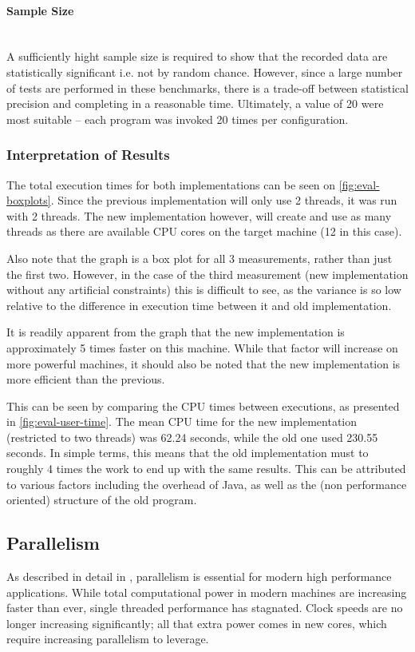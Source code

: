 \paragraph{Sample Size} \hfill \\
A sufficiently hight sample size is required to show that the recorded data are statistically significant i.e. not by random chance. However, since a large number of tests are performed in these benchmarks, there is a trade-off between statistical precision and completing in a reasonable time.
Ultimately, a value of 20 were most suitable -- each program was invoked 20 times per configuration.

\subsubsection{Interpretation of Results}
The total execution times for both implementations can be seen on \autoref{fig:eval-boxplots}. Since the previous implementation will only use 2 threads, it was run with 2 threads. 
The new implementation however, will create and use as many threads as there are available CPU cores on the target machine (12 in this case).

Also note that the graph is a box plot for all 3 measurements, rather than just the first two. However, in the case of the third measurement (new implementation without any artificial constraints) this is difficult to see, as the variance is so low relative to the difference in execution time between it and old implementation.

It is readily apparent from the graph that the new implementation is approximately 5 times faster on this machine. While that factor will increase on more powerful machines, it should also be noted that the new implementation is more efficient than the previous.

This can be seen by comparing the CPU times between executions, as presented in \autoref{fig:eval-user-time}. The mean CPU time for the new implementation (restricted to two threads) was 62.24 seconds, while the old one used 230.55 seconds. In simple terms, this means that the old implementation must to roughly 4 times the work to end up with the same results. This can be attributed to various factors including the overhead of Java, as well as the (non performance oriented) structure of the old program. 

\subsection{Parallelism}
As described in detail in , parallelism is essential for modern high performance applications. While total computational power in modern machines are increasing faster than ever, single threaded performance has stagnated. Clock speeds are no longer increasing significantly; all that extra power comes in new cores, which require increasing parallelism to leverage. 

